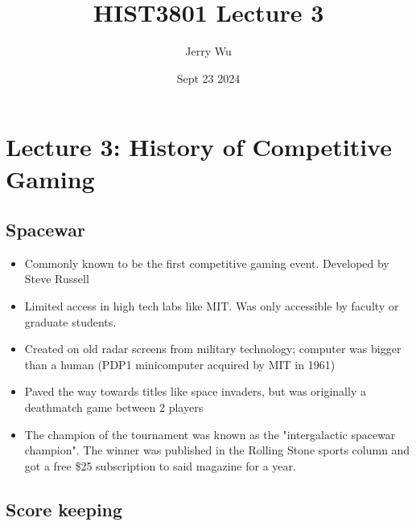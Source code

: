 \documentclass[12pt]{book}
\title{HIST3801 Lecture 3}
\author{Jerry Wu}
\date{Sept 23 2024}
\begin{document}
\maketitle

\tableofcontents

\chapter{Lecture 3: History of Competitive Gaming}

\section{Spacewar}

\begin{itemize}
    \item Commonly known to be the first competitive gaming event. Developed by Steve Russell
    \item Limited access in high tech labs like MIT. Was only accessible by faculty or graduate students.
    \item Created on old radar screens from military technology; computer was bigger than a human (PDP1 minicomputer acquired by MIT in 1961)
    \item Paved the way towards titles like space invaders, but was originally a deathmatch game between 2 players
    \item The champion of the tournament was known as the "intergalactic spacewar champion". The winner was published in the Rolling Stone sports column and got a free \$25 subscription to said magazine for a year.
\end{itemize}

\section{Score keeping}
\end{document}
